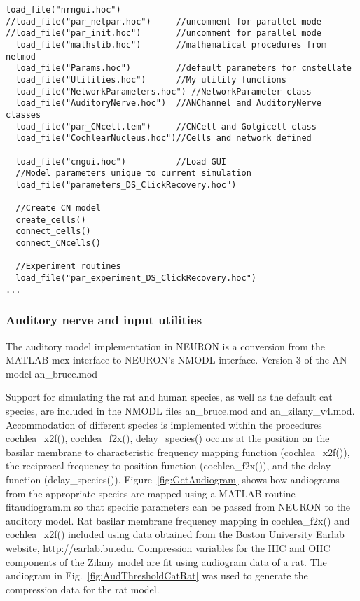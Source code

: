\citep{RothmanManis:2003b}


\begin{lstlisting}[label=lst:headerlines,caption={Headerlines in \mbox{\textsf{DS\_ClickRecovery\.hoc}} show a typical setup in a \textsf{cnstellate} simulation.}]
  load_file("nrngui.hoc")
//load_file("par_netpar.hoc")     //uncomment for parallel mode
//load_file("par_init.hoc")       //uncomment for parallel mode
  load_file("mathslib.hoc")       //mathematical procedures from netmod
  load_file("Params.hoc")         //default parameters for cnstellate
  load_file("Utilities.hoc")      //My utility functions
  load_file("NetworkParameters.hoc") //NetworkParameter class
  load_file("AuditoryNerve.hoc")  //ANChannel and AuditoryNerve classes
  load_file("par_CNcell.tem")     //CNCell and Golgicell class
  load_file("CochlearNucleus.hoc")//Cells and network defined

  load_file("cngui.hoc")          //Load GUI
  //Model parameters unique to current simulation
  load_file("parameters_DS_ClickRecovery.hoc")

  //Create CN model
  create_cells()
  connect_cells()
  connect_CNcells()

  //Experiment routines
  load_file("par_experiment_DS_ClickRecovery.hoc")
...

\end{lstlisting}




\subsubsection{Auditory nerve and input utilities} \label{sec:APDX:auditory-nerve-input}

The auditory model implementation in NEURON is a conversion from the MATLAB mex interface to NEURON's NMODL interface. Version 3 of the AN model \mbox{\textsf{an\_bruce.mod}}

Support for simulating the rat and human species, as well as the default cat species, are included in the NMODL files \mbox{\textsf{an\_bruce.mod}} and \mbox{\textsf{an\_zilany\_v4.mod}}.
Accommodation of different species is implemented within the procedures \mbox{\textsf{cochlea\_x2f()}}, \mbox{\textsf{cochlea\_f2x()}}, \mbox{\textsf{delay\_species()}} occurs at the position on the basilar membrane to characteristic frequency mapping function (\mbox{\textsf{cochlea\_x2f()}}), the reciprocal frequency to position function (\mbox{\textsf{cochlea\_f2x()}}), and the delay function (\mbox{\textsf{delay\_species()}}).
Figure~\ref{fig:GetAudiogram} shows how audiograms from the appropriate species are mapped using a MATLAB routine \mbox{\textsf{fitaudiogram.m}} so that specific parameters can be passed from NEURON to the auditory model.
Rat basilar membrane frequency mapping in \mbox{\textsf{cochlea\_f2x()}} and \mbox{\textsf{cochlea\_x2f()}} included using data obtained from the Boston University Earlab website, \url{http://earlab.bu.edu}.
Compression variables for the IHC and OHC components of the Zilany model are fit using audiogram data of a rat.
The audiogram in Fig.~\ref{fig:AudThresholdCatRat} was used to generate the compression data for the rat model.

